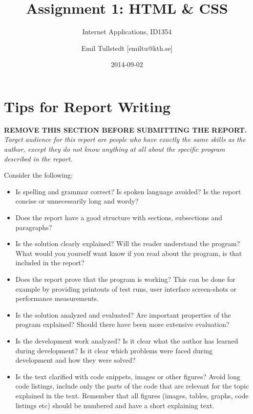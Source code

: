 \documentclass[a4paper]{scrartcl}
\title{Assignment 1: HTML \& CSS}
\subtitle{Internet Applications, ID1354}
\author{Emil Tullstedt [emiltu@kth.se]}
\date{2014-09-02}
\begin{document}
\maketitle

\section*{Tips for Report Writing}
\textbf{REMOVE THIS SECTION BEFORE SUBMITTING THE REPORT.}\\

\noindent \textit{Target audience for this report are people who have exactly the same skills as the author, except they do not know anything at all about the specific program described in the report.}

Consider the following:

\begin{itemize}
  \item Is spelling and grammar correct? Is spoken language avoided? Is the report concise or unnecessarily long and wordy?

  \item Does the report have a good structure with sections, subsections and paragraphs?

  \item Is the solution clearly explained? Will the reader understand the program? What would you yourself want know if you read about the program, is that included in the report?

  \item Does the report prove that the program is working? This can be done for example by providing printouts of test runs, user interface screen-shots or performance measurements.

  \item Is the solution analyzed and evaluated? Are important properties of the program explained? Should there have been more extensive evaluation?

  \item Is the development work analyzed? Is it clear what the author has learned during development? Is it clear which problems were faced during development and how they were solved?

  \item Is the text clarified with code snippets, images or other figures? Avoid long code listings, include only the parts of the code that are relevant for the topic explained in the text. Remember that all figures (images, tables, graphs, code listings etc) should be numbered and have a short explaining text.
\end{itemize}
\end{document}
